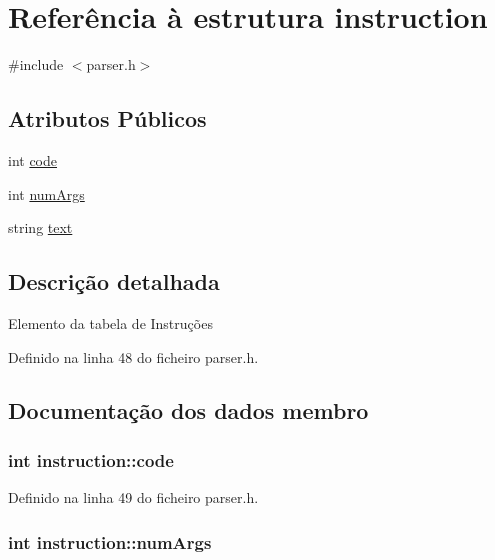 \hypertarget{structinstruction}{\section{Referência à estrutura instruction}
\label{structinstruction}
}


{\ttfamily \#include $<$parser.\-h$>$}

\subsection*{Atributos Públicos}
\begin{DoxyCompactItemize}
\item 
int \hyperlink{structinstruction_a20ba1219d473773f35384214c08f717c}{code}
\item 
int \hyperlink{structinstruction_abb5712c98f149b197b5c58b2dac15a03}{num\-Args}
\item 
string \hyperlink{structinstruction_af31af10ecfe7d2fdf154616d0aede8ea}{text}
\end{DoxyCompactItemize}


\subsection{Descrição detalhada}
Elemento da tabela de Instruções 

Definido na linha 48 do ficheiro parser.\-h.



\subsection{Documentação dos dados membro}
\hypertarget{structinstruction_a20ba1219d473773f35384214c08f717c}{
\subsubsection[{code}]{\setlength{\rightskip}{0pt plus 5cm}int instruction\-::code}}\label{structinstruction_a20ba1219d473773f35384214c08f717c}


Definido na linha 49 do ficheiro parser.\-h.

\hypertarget{structinstruction_abb5712c98f149b197b5c58b2dac15a03}{
\subsubsection[{num\-Args}]{\setlength{\rightskip}{0pt plus 5cm}int instruction\-::num\-Args}}\label{structinstruction_abb5712c98f149b197b5c58b2dac15a03}


